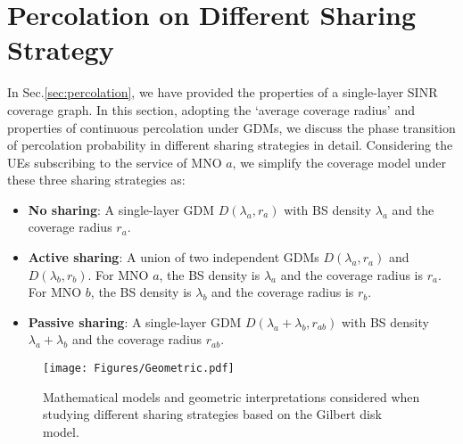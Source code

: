 \documentclass[final]{IEEEtran}
\begin{document}
\section{Percolation on Different Sharing Strategy}
\label{sec:sharing}
In Sec.\ref{sec:percolation}, we have provided the properties of a single-layer SINR coverage graph. In this section, adopting the `average coverage radius' and properties of continuous percolation under GDMs, we discuss the phase transition of percolation probability in different sharing strategies in detail. Considering the UEs subscribing to the service of MNO $a$, we simplify the coverage model under these three sharing strategies as:
\begin{itemize}
    \item \textbf{No sharing}: A single-layer GDM $D(\lambda_a,r_{a})$ with BS density $\lambda_a$ and the coverage radius $r_{a}$.
    \item \textbf{Active sharing}: A union of two independent GDMs $D(\lambda_a,r_{a})$ and $D(\lambda_b,r_{b})$. For MNO $a$, the BS density is $\lambda_a$ and the coverage radius is $r_{a}$. For MNO $b$, the BS density is $\lambda_b$ and the coverage radius is $r_{b}$.
    \item \textbf{Passive sharing}: A single-layer GDM $D(\lambda_a+\lambda_b,r_{ab})$ with BS density $\lambda_a+\lambda_b$ and the coverage radius $r_{ab}$.
\end{itemize}

\begin{figure*}[htbp]
    \centering
    \texttt{[image: Figures/Geometric.pdf]}
    \caption{Mathematical models and geometric interpretations considered when studying different sharing strategies based on the Gilbert disk model.}
    \label{fig:Geometric}
\end{figure*}
\end{document}
